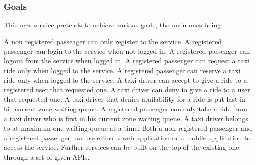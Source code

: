 \subsubsection{Goals}
This new service pretends to achieve various goals, the main ones being:
\begin{itemize}
	 A non registered passenger can only register to the service.
	 A registered passenger can login to the service when not logged in.
	 A registered passenger can logout from the service when logged in.
	 A registered passenger can request a taxi ride only when logged to the service.
	 A registered passenger can reserve a taxi ride only when logged to the service.
	 A taxi driver can accept to give a ride to a registered user that requested one.
	 A taxi driver can deny to give a ride to a user that requested one.
	 A taxi driver that denies availability for a ride is put last in his current zone waiting queue.
	 A registered passenger can only take a ride from a taxi driver who is first in his current zone waiting queue.
	 A taxi driver belongs to at maximum one waiting queue at a time.
	 Both a non registered passenger and a registered passenger can use either a web application or a mobile application to access the service.
	 Further services can be built on the top of the existing one through a set of given APIs.
\end{itemize}
